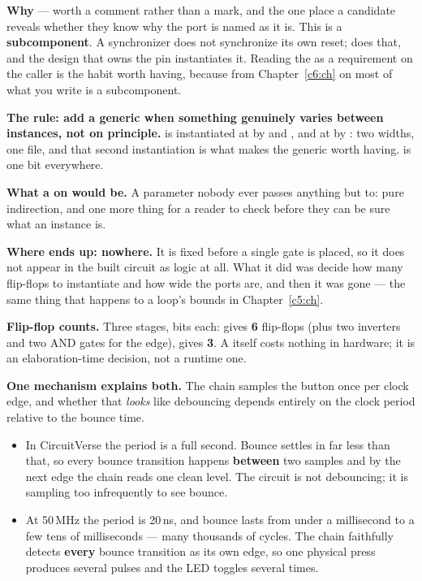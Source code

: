 \textbf{Why } --- worth a comment rather than a mark, and the one place a candidate
reveals whether they know why the port is named as it is. This is a \textbf{subcomponent}. A
synchronizer does not synchronize its own reset;  does that, and the design that
owns the pin instantiates it. Reading the  as a requirement on the caller is the habit
worth having, because from Chapter~\ref{c6:ch} on most of what you write is a subcomponent.

\textbf{The rule: add a generic when something genuinely varies between instances, not on
principle.}  is instantiated at  by  and
, and at  by : two widths, one file, and that second
instantiation is what makes the generic worth having.  is one bit everywhere.

\textbf{What a  on  would be.} A parameter nobody ever passes anything
but  to: pure indirection, and one more thing for a reader to check before they can be sure
what an instance is. 

\textbf{Where  ends up: nowhere.} It is fixed before a single gate is placed, so it does
not appear in the built circuit as logic at all. What it did was decide how many flip-flops to
instantiate and how wide the ports are, and then it was gone --- the same thing that happens to a
 loop's bounds in Chapter~\ref{c5:ch}. 

\textbf{Flip-flop counts.} Three stages,  bits each:  gives \textbf{6}
flip-flops (plus two inverters and two AND gates for the edge),  gives \textbf{3}.
A  itself costs nothing in hardware; it is an elaboration-time decision, not a
runtime one. 

\textbf{One mechanism explains both.} The chain samples the button once per clock edge, and whether
that \emph{looks} like debouncing depends entirely on the clock period relative to the bounce time.
\begin{itemize}
  \item In CircuitVerse the period is a full second. Bounce settles in far less than that, so every
    bounce transition happens \textbf{between} two samples and by the next edge the chain reads one
    clean level. The circuit is not debouncing; it is sampling too infrequently to see bounce.
  \item At 50\,MHz the period is 20\,ns, and bounce lasts from under a millisecond to a few tens of
    milliseconds --- many thousands of cycles. The chain faithfully detects \textbf{every} bounce
    transition as its own edge, so one physical press produces several pulses and the LED toggles
    several times.
\end{itemize}
\noindent{}

